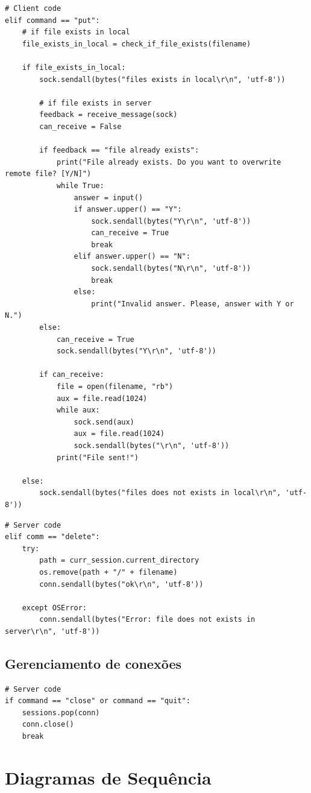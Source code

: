 \documentclass[conference]{IEEEtran}
\begin{document}
\begin{lstlisting}
# Client code
elif command == "put":
	# if file exists in local
	file_exists_in_local = check_if_file_exists(filename)

	if file_exists_in_local:
		sock.sendall(bytes("files exists in local\r\n", 'utf-8'))
		
		# if file exists in server
		feedback = receive_message(sock)
		can_receive = False

		if feedback == "file already exists":
			print("File already exists. Do you want to overwrite remote file? [Y/N]")
			while True:
				answer = input()
				if answer.upper() == "Y":
					sock.sendall(bytes("Y\r\n", 'utf-8'))
					can_receive = True
					break
				elif answer.upper() == "N":
					sock.sendall(bytes("N\r\n", 'utf-8'))
					break
				else:
					print("Invalid answer. Please, answer with Y or N.")
		else:
			can_receive = True
			sock.sendall(bytes("Y\r\n", 'utf-8'))

		if can_receive:
			file = open(filename, "rb")
			aux = file.read(1024)
			while aux:
				sock.send(aux)
				aux = file.read(1024)
				sock.sendall(bytes("\r\n", 'utf-8'))
			print("File sent!")

	else:
		sock.sendall(bytes("files does not exists in local\r\n", 'utf-8'))
\end{lstlisting}

\begin{lstlisting}
# Server code
elif comm == "delete":
	try:
		path = curr_session.current_directory
	    os.remove(path + "/" + filename)
	    conn.sendall(bytes("ok\r\n", 'utf-8'))

	except OSError:
	    conn.sendall(bytes("Error: file does not exists in server\r\n", 'utf-8'))
\end{lstlisting}

\subsection{Gerenciamento de conexões}

\begin{lstlisting}
# Server code
if command == "close" or command == "quit":
	sessions.pop(conn)
	conn.close()
	break
\end{lstlisting}

\section{Diagramas de Sequência}
\end{document}
